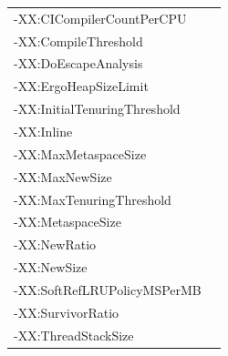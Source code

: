 \documentclass[
  digital, %
  oneside,
  notable, %
  nolof,     %
  nolot     %
]{fithesis3}
\begin{document}
\begin{table}[]
\begin{tabular}{ll}
	\multicolumn{1}{|l|}{-XX:CICompilerCountPerCPU}                  &                                                             \\ \cline{1-1}
	\multicolumn{1}{|l|}{-XX:CompileThreshold}                       &                                                             \\ \cline{1-1}
	\multicolumn{1}{|l|}{-XX:DoEscapeAnalysis}                       &                                                             \\ \cline{1-1}
	\multicolumn{1}{|l|}{-XX:ErgoHeapSizeLimit}                      &                                                             \\ \cline{1-1}
	\multicolumn{1}{|l|}{-XX:InitialTenuringThreshold}               &                                                             \\ \cline{1-1}
	\multicolumn{1}{|l|}{-XX:Inline}                                 &                                                             \\ \cline{1-1}
	\multicolumn{1}{|l|}{-XX:MaxMetaspaceSize}                       &                                                             \\ \cline{1-1}
	\multicolumn{1}{|l|}{-XX:MaxNewSize}                             &                                                             \\ \cline{1-1}
	\multicolumn{1}{|l|}{-XX:MaxTenuringThreshold}                   &                                                             \\ \cline{1-1}
	\multicolumn{1}{|l|}{-XX:MetaspaceSize}                          &                                                             \\ \cline{1-1}
	\multicolumn{1}{|l|}{-XX:NewRatio}                               &                                                             \\ \cline{1-1}
	\multicolumn{1}{|l|}{-XX:NewSize}                                &                                                             \\ \cline{1-1}
	\multicolumn{1}{|l|}{-XX:SoftRefLRUPolicyMSPerMB}                &                                                             \\ \cline{1-1}
	\multicolumn{1}{|l|}{-XX:SurvivorRatio}                          &                                                             \\ \cline{1-1}
	\multicolumn{1}{|l|}{-XX:ThreadStackSize}                        &                                                             \\ \cline{1-1}

\end{tabular}
\end{table}
\end{document}
